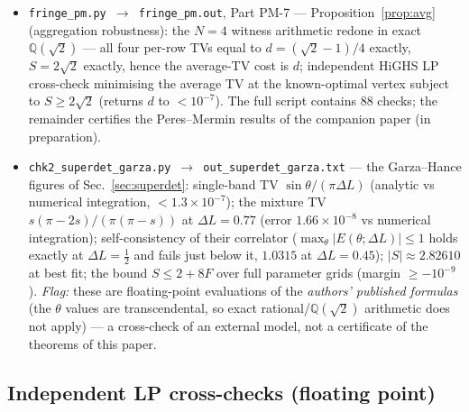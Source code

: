 \documentclass[aps,pra,reprint,superscriptaddress,floatfix]{revtex4-2}
\begin{document}
\begin{itemize}
  $I_{\mathrm{R}}\approx0.046274$ and
  $I_{\mathrm{C}}\approx0.080170$ recomputed from their formulas. (The
  script prints these values to six decimals but asserts them only to
  $2\times10^{-3}$; they were independently recomputed to the printed
  digits in the review of 2026-09-03.)
\item \texttt{fringe\_pm.py $\to$ fringe\_pm.out}, Part PM-7 ---
  Proposition~\ref{prop:avg} (aggregation robustness): the $N=4$
  witness arithmetic redone in exact $\mathbb{Q}(\sqrt2)$ --- all four
  per-row TVs equal to $d=(\sqrt2-1)/4$ exactly, $S=2\sqrt2$ exactly,
  hence the average-TV cost is $d$; independent HiGHS LP cross-check
  minimising the average TV at the known-optimal vertex subject to
  $S\ge2\sqrt2$ (returns $d$ to $<10^{-7}$). The full script contains
  $88$ checks; the remainder certifies the Peres--Mermin results of the
  companion paper (in preparation).
\item \texttt{chk2\_superdet\_garza.py $\to$ out\_superdet\_garza.txt} ---
  the Garza--Hance figures of Sec.~\ref{sec:superdet}: single-band TV
  $\sin\theta/(\pi\Delta L)$ (analytic vs numerical integration,
  $<1.3\times10^{-7}$); the mixture TV
  $s(\pi-2s)/(\pi(\pi-s))$ at $\Delta L=0.77$ (error
  $1.66\times10^{-8}$ vs numerical integration); self-consistency of
  their correlator ($\max_\theta|E(\theta;\Delta L)|\le1$ holds exactly
  at $\Delta L=\tfrac12$ and fails just below it, $1.0315$ at
  $\Delta L=0.45$); $|S|\approx2.82610$ at best fit; the bound
  $S\le2+8F$ over full parameter grids (margin $\ge-10^{-9}$).
  \emph{Flag:} these are floating-point evaluations of the
  \emph{authors' published formulas} (the $\theta$ values are
  transcendental, so exact rational/$\mathbb{Q}(\sqrt2)$ arithmetic does
  not apply) --- a cross-check of an external model, not a certificate of
  the theorems of this paper.
\end{itemize}

\subsection{Independent LP cross-checks (floating point)}
\end{document}
